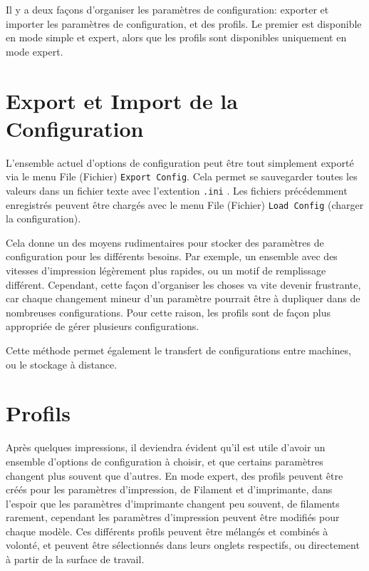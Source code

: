 
Il y a deux façons d'organiser les param\`etres de configuration: exporter et importer les param\`etres de configuration, et des profils. Le premier est disponible en mode simple et expert, alors que les profils sont disponibles uniquement en mode expert.

\section{Export et Import de la Configuration} %
\label{sub:exporting_and_importing_configuration}

L'ensemble actuel d'options de configuration peut \^etre tout simplement export\'e via le menu File (Fichier)  \texttt{Export Config}. Cela permet se sauvegarder toutes les valeurs dans un fichier texte avec l'extention \texttt{.ini} .  Les fichiers pr\'ec\'edemment enregistr\'es peuvent \^etre charg\'es avec le menu File (Fichier) \texttt{Load Config} (charger la configuration).

Cela donne un des moyens rudimentaires pour stocker des param\`etres de configuration pour les diff\'erents besoins. Par exemple, un ensemble avec des vitesses d'impression l\'eg\`erement plus rapides, ou un motif de remplissage diff\'erent. Cependant, cette façon d'organiser les choses va vite devenir frustrante, car chaque changement mineur d'un param\`etre pourrait \^etre \`a dupliquer dans de nombreuses configurations. Pour cette raison, les profils sont de façon plus appropri\'ee de g\'erer plusieurs configurations.

Cette m\'ethode permet \'egalement le transfert de configurations entre machines, ou le stockage \`a distance.



\section{Profils} %
\label{sec:profiles}

Apr\`es quelques impressions, il deviendra \'evident qu'il est utile d'avoir un ensemble d'options de configuration \`a choisir, et que certains param\`etres changent plus souvent que d'autres. En mode expert, des profils peuvent \^etre cr\'e\'es pour les param\`etres d'impression, de Filament et d'imprimante, dans l'espoir que les param\`etres d'imprimante changent peu souvent, de filaments rarement, cependant les param\`etres d'impression peuvent \^etre modifi\'es pour chaque mod\`ele. Ces diff\'erents profils peuvent \^etre m\'elang\'es et combin\'es \`a volont\'e, et peuvent \^etre s\'electionn\'es dans leurs onglets respectifs, ou directement \`a partir de la surface de travail.

